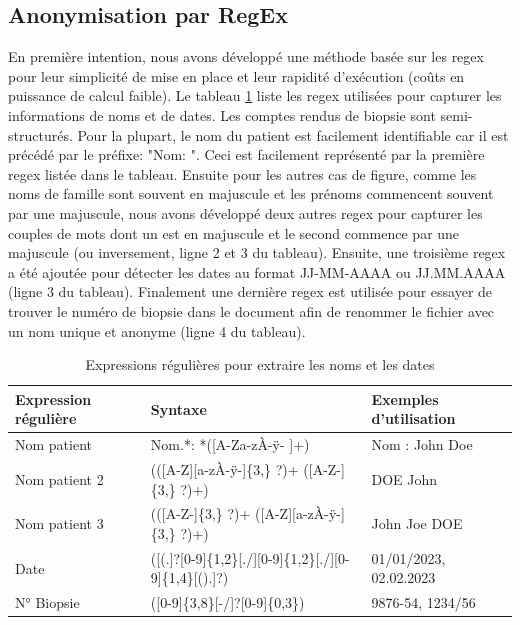 \subsection{Anonymisation par RegEx}
En première intention, nous avons développé une méthode basée sur les \gls{regex} pour leur simplicité de mise en place et leur rapidité d'exécution (coûts en puissance de calcul faible). Le tableau \ref{tab:regex} liste les \gls{regex} utilisées pour capturer les informations de noms et de dates. Les comptes rendus de biopsie sont semi-structurés. Pour la plupart, le nom du patient est facilement identifiable car il est précédé par le préfixe: "Nom: ". Ceci est facilement représenté par la première \gls{regex} listée dans le tableau. Ensuite pour les autres cas de figure, comme les noms de famille sont souvent en majuscule et les prénoms commencent souvent par une majuscule, nous avons développé deux autres \gls{regex} pour capturer les couples de mots dont un est en majuscule et le second commence par une majuscule (ou inversement, ligne 2 et 3 du tableau). 
Ensuite, une troisième \gls{regex} a été ajoutée pour détecter les dates au format JJ-MM-AAAA ou JJ.MM.AAAA (ligne 3 du tableau). Finalement une dernière \gls{regex} est utilisée pour essayer de trouver le numéro de biopsie dans le document afin de renommer le fichier avec un nom unique et anonyme (ligne 4 du tableau). 
\begin{table}[!ht]
\centering
\caption{Expressions régulières pour extraire les noms et les dates}
\label{tab:regex}
\begin{tabular}{|l|l|l|}
\hline
\textbf{Expression régulière} & \textbf{Syntaxe} & \textbf{Exemples d'utilisation} \\ \hline
Nom patient & Nom.*: *([A-Za-zÀ-ÿ- ]+) & Nom : John Doe \\ \hline
Nom patient 2& (([A-Z][a-zÀ-ÿ-]\{3,\} ?)+ ([A-Z-]\{3,\} ?)+) & DOE John \\ \hline
Nom patient 3 & (([A-Z-]\{3,\} ?)+ ([A-Z][a-zÀ-ÿ-]\{3,\} ?)+) & John Joe DOE \\ \hline
Date & ([(.]?[0-9]\{1,2\}[./][0-9]\{1,2\}[./][0-9]\{1,4\}[().]?) & 01/01/2023, 02.02.2023 \\ \hline
N° Biopsie & ([0-9]\{3,8\}[-/]?[0-9]\{0,3\}) & 9876-54, 1234/56 \\ \hline
\end{tabular}
\end{table}
